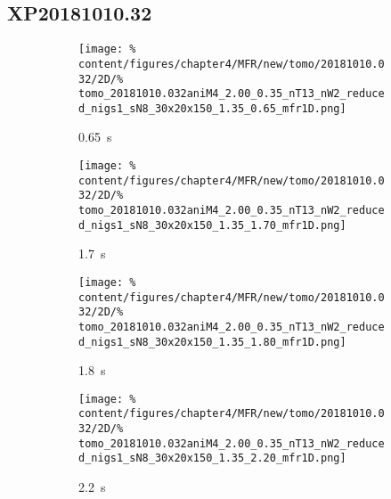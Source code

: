         \subsection*{XP20181010.32}%
%
            \begin{figure}[t]%
                \centering%
                \begin{subfigure}{0.45\textwidth}%
                    \centering%
                    \caption{\SI{0.65}{\second}}%
                    \texttt{[image: \%
                        content/figures/chapter4/MFR/new/tomo/20181010.032/2D/\%
                        tomo\_20181010.032aniM4\_2.00\_0.35\_nT13\_nW2\_reduced\_nigs1\_sN8\_30x20x150\_1.35\_0.65\_mfr1D.png]}%
                    \end{subfigure}%
                \hfill%
                \begin{subfigure}{0.45\textwidth}%
                    \centering%
                    \caption{\SI{1.7}{\second}}%
                    \texttt{[image: \%
                        content/figures/chapter4/MFR/new/tomo/20181010.032/2D/\%
                        tomo\_20181010.032aniM4\_2.00\_0.35\_nT13\_nW2\_reduced\_nigs1\_sN8\_30x20x150\_1.35\_1.70\_mfr1D.png]}%
                \end{subfigure}%
                \newline%
                \begin{subfigure}{0.45\textwidth}%
                    \centering%
                    \caption{\SI{1.8}{\second}}%
                    \texttt{[image: \%
                        content/figures/chapter4/MFR/new/tomo/20181010.032/2D/\%
                        tomo\_20181010.032aniM4\_2.00\_0.35\_nT13\_nW2\_reduced\_nigs1\_sN8\_30x20x150\_1.35\_1.80\_mfr1D.png]}%
                    \end{subfigure}%
                \hfill%
                \begin{subfigure}{0.45\textwidth}%
                    \centering%
                    \caption{\SI{2.2}{\second}}%
                    \texttt{[image: \%
                        content/figures/chapter4/MFR/new/tomo/20181010.032/2D/\%
                        tomo\_20181010.032aniM4\_2.00\_0.35\_nT13\_nW2\_reduced\_nigs1\_sN8\_30x20x150\_1.35\_2.20\_mfr1D.png]}%
                \end{subfigure}%
                \newline%
                \begin{subfigure}{0.45\textwidth}%
                    \centering%

\end{subfigure}
\end{figure}
